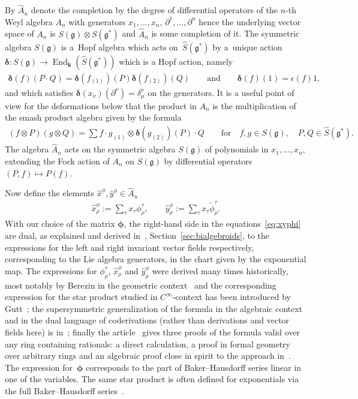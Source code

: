 \documentclass[10pt,a4paper]{amsart}
\def\genfd{\mathbf{k}}
\def\gg{\mathfrak{g}}
\def\End{\operatorname{End}}
\numberwithin{equation}{section}
\begin{document}
By $\hat{A}_n$ denote the completion by the degree of differential operators of the $n$-th Weyl algebra $A_n$ with generators $x_1,\dots,x_n$, $\partial^1,\dots,\partial^n$ hence the underlying vector space of $A_n$ is $S(\gg)\otimes S(\gg^*)$ and $\hat{A}_n$ is some completion of it. The symmetric algebra $S(\gg)$ is a~Hopf algebra which acts on~$\hat{S}(\gg^*)$ by a~unique action ${\boldsymbol \delta}\colon S(\gg)\to\End_\genfd(\hat{S}(\gg^*))$ which is a Hopf action, namely
\begin{gather*}{\boldsymbol \delta}(f)(P\cdot Q)={\boldsymbol \delta}(f_{(1)})(P){\boldsymbol \delta}(f_{(2)})(Q)\qquad \text{and}\qquad {\boldsymbol \delta}(f)(1) = \epsilon(f) 1, \end{gather*}
and which satisfies ${\boldsymbol \delta}(x_\nu)(\partial^\nu) = \delta^\nu_\mu$ on the generators. It is a useful point of view for the deformations below that the product in $A_n$ is the multiplication of the smash product algebra given by the formula
\begin{gather*}(f\otimes P) (g\otimes Q) = \sum f\cdot g_{(1)}\otimes {\boldsymbol \delta}(g_{(2)})(P)\cdot Q\qquad \text{for}\quad f,g\in S(\gg),\quad P,Q\in\hat{S}(\gg^*).\end{gather*}
The algebra $\hat{A}_n$ acts on the symmetric algebra $S(\gg)$ of polynomials in $x_1,\dots,x_n$, extending the Fock action of $A_n$ on $S(\gg)$ by differential operators $(P,f)\mapsto P(f)$.

Now define the elements $\hat{x}^\phi,\hat{y}^\phi\in\hat{A}_n$
\begin{gather}\label{eq:xyphi}
\hat{x}^\phi_\rho := \sum_\tau x_\tau \phi^\tau_\rho,\qquad \hat{y}^\phi_\rho := \sum_\tau x_\tau\tilde\phi^\tau_\rho.
\end{gather}
With our choice of the matrix ${\boldsymbol \phi}$, the right-hand side in the equations~\eqref{eq:xyphi} are dual, as explained and derived in~\cite{halg}, Section~\ref{sec:bialgebroids}, to the expressions for the left and right invariant vector fields respectively, corresponding to the Lie algebra generators, in the chart given by the exponential map. The expressions for $\phi^\tau_\rho$, $\hat{x}^\phi_\rho$ and $\hat{y}^\phi_\rho$ were derived many times historically, most notably by Berezin in the geometric context~\cite{berezin} and the corresponding expression for the star product studied in $C^\infty$-context has been introduced by Gutt~\cite{gutt}; the supersymmetric generalization of the formula in the algebraic context and in the dual language of coderivations (rather than derivations and vector fields here) is in~\cite{Petracci}; finally the article~\cite{ldWeyl} gives three proofs of the formula valid over any ring containing rationals: a direct calculation, a proof in formal geometry over arbitrary rings and an algebraic proof close in spirit to the approach in~\cite{Petracci}. The expression for~${\boldsymbol \phi}$ corresponds to the part of Baker--Hausdorff series linear in one of the variables. The same star product is often defined for exponentials via the full Baker--Hausdorff series~\cite{Amelino,HallidaySzabo,exp}.
\end{document}
